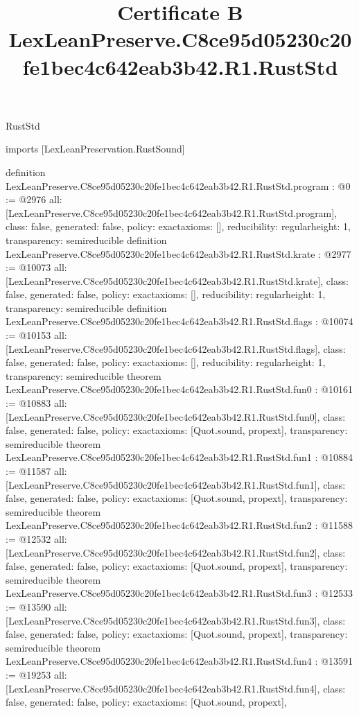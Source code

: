 \begin{lexlean}{RustStd}
\title{Certificate B LexLeanPreserve.C8ce95d05230c20fe1bec4c642eab3b42.R1.RustStd}
\begin{coremodule}
imports [LexLeanPreservation.RustSound]

definition LexLeanPreserve.C8ce95d05230c20fe1bec4c642eab3b42.R1.RustStd.program : @0 := @2976 {
  all: [LexLeanPreserve.C8ce95d05230c20fe1bec4c642eab3b42.R1.RustStd.program],
  class: false,
  generated: false,
  policy: exact{axioms: []},
  reducibility: regular{height: 1},
  transparency: semireducible
}
definition LexLeanPreserve.C8ce95d05230c20fe1bec4c642eab3b42.R1.RustStd.krate : @2977 := @10073 {
  all: [LexLeanPreserve.C8ce95d05230c20fe1bec4c642eab3b42.R1.RustStd.krate],
  class: false,
  generated: false,
  policy: exact{axioms: []},
  reducibility: regular{height: 1},
  transparency: semireducible
}
definition LexLeanPreserve.C8ce95d05230c20fe1bec4c642eab3b42.R1.RustStd.flags : @10074 := @10153 {
  all: [LexLeanPreserve.C8ce95d05230c20fe1bec4c642eab3b42.R1.RustStd.flags],
  class: false,
  generated: false,
  policy: exact{axioms: []},
  reducibility: regular{height: 1},
  transparency: semireducible
}
theorem LexLeanPreserve.C8ce95d05230c20fe1bec4c642eab3b42.R1.RustStd.fun0 : @10161 := @10883 {
  all: [LexLeanPreserve.C8ce95d05230c20fe1bec4c642eab3b42.R1.RustStd.fun0],
  class: false,
  generated: false,
  policy: exact{axioms: [Quot.sound, propext]},
  transparency: semireducible
}
theorem LexLeanPreserve.C8ce95d05230c20fe1bec4c642eab3b42.R1.RustStd.fun1 : @10884 := @11587 {
  all: [LexLeanPreserve.C8ce95d05230c20fe1bec4c642eab3b42.R1.RustStd.fun1],
  class: false,
  generated: false,
  policy: exact{axioms: [Quot.sound, propext]},
  transparency: semireducible
}
theorem LexLeanPreserve.C8ce95d05230c20fe1bec4c642eab3b42.R1.RustStd.fun2 : @11588 := @12532 {
  all: [LexLeanPreserve.C8ce95d05230c20fe1bec4c642eab3b42.R1.RustStd.fun2],
  class: false,
  generated: false,
  policy: exact{axioms: [Quot.sound, propext]},
  transparency: semireducible
}
theorem LexLeanPreserve.C8ce95d05230c20fe1bec4c642eab3b42.R1.RustStd.fun3 : @12533 := @13590 {
  all: [LexLeanPreserve.C8ce95d05230c20fe1bec4c642eab3b42.R1.RustStd.fun3],
  class: false,
  generated: false,
  policy: exact{axioms: [Quot.sound, propext]},
  transparency: semireducible
}
theorem LexLeanPreserve.C8ce95d05230c20fe1bec4c642eab3b42.R1.RustStd.fun4 : @13591 := @19253 {
  all: [LexLeanPreserve.C8ce95d05230c20fe1bec4c642eab3b42.R1.RustStd.fun4],
  class: false,
  generated: false,
  policy: exact{axioms: [Quot.sound, propext]},
}
\end{coremodule}
\end{lexlean}
